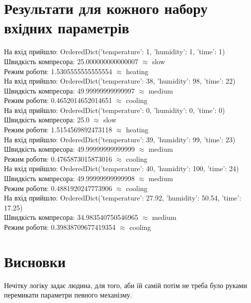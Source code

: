 \documentclass{article}
\begin{document}
    \section{Результати для кожного набору вхідних параметрів}

    На вхід прийшло: OrderedDict({'temperature': 1, 'humidity': 1, 'time': 1}) \\
    Швидкість компресора: 25.000000000000007 $ \approx $ slow \\
    Режим роботи: 1.5305555555555554 $ \approx $ heating \\

    На вхід прийшло: OrderedDict({'temperature': 38, 'humidity': 98, 'time': 22}) \\
    Швидкість компресора: 49.99999999999997 $ \approx $ medium \\
    Режим роботи: 0.4652014652014651 $ \approx $ cooling \\

    На вхід прийшло: OrderedDict({'temperature': 0, 'humidity': 0, 'time': 0}) \\
    Швидкість компресора: 25.0 $ \approx $ slow \\
    Режим роботи: 1.5154569892473118 $ \approx $ heating \\

    На вхід прийшло: OrderedDict({'temperature': 39, 'humidity': 99, 'time': 23}) \\
    Швидкість компресора: 49.99999999999999 $ \approx $ medium \\
    Режим роботи: 0.4765873015873016 $ \approx $ cooling \\

    На вхід прийшло: OrderedDict({'temperature': 40, 'humidity': 100, 'time': 24}) \\
    Швидкість компресора: 49.99999999999998 $ \approx $ medium \\
    Режим роботи: 0.4881920247773906 $ \approx $ cooling \\

    На вхід прийшло: OrderedDict({'temperature': 27.92, 'humidity': 50.54, 'time': 17.25}) \\
    Швидкість компресора: 34.983540750546965 $ \approx $ medium \\
    Режим роботи: 0.39838709677419354 $ \approx $ cooling \\
    
    \section{Висновки}
        Нечітку логіку задає людина, для того, аби їй самій потім не треба було руками перемикати параметри певного механізму.
\end{document}
